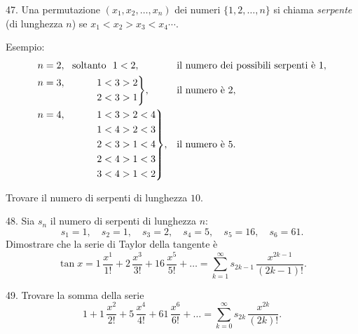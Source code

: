 \begin{problem}{47.}
	Una permutazione $(x_1,x_2, \dotsc,x_n)$ dei numeri $\{1, 2, \dotsc, n\}$ si chiama \emph{serpente} (di lunghezza $n$) se $x_1<x_2>x_3<x_4 \dotsb$.

	\begin{note}{Esempio:}
		\begin{equation*}
			\begin{aligned}[t]
				&\begin{aligned}[t] n=2, \text{\ \ soltanto\ \ } 1<2, \end{aligned} &&\text{il numero dei possibili serpenti è }1, \\
				&\hskip-\nulldelimiterspace\mathord{\left.\begin{aligned} n=3, \hphantom{\text{\ \ only\ \ }} 1&<3>2 \\ 
				2&<3>1\end{aligned} \right\}}, && \text{il numero è }2, \\
				&\hskip-\nulldelimiterspace\mathord{\left.\begin{aligned} n=4, \hphantom{\text{\ \ only\ \ }} 1&<3>2<4 \\ 
				1&<4>2<3 \\ 
				2&<3>1<4 \\ 
				2&<4>1<3 \\ 
				3&<4>1<2\end{aligned} \right\}},
				&&\text{il numero è }5. \\
			\end{aligned}
		\end{equation*}
	\end{note}
	Trovare il numero di serpenti di lunghezza  $10$.
\end{problem}

\begin{problem}{48.}
	Sia $s_n$ il numero di serpenti di lunghezza $n$:
	\begin{equation*}
		s_1=1, \quad s_2=1, \quad s_3=2, \quad s_4=5, \quad s_5=16, \quad s_6=61.
	\end{equation*}
	Dimostrare che la serie di Taylor della tangente è
	\begin{equation*}
		\tan x=1\, \frac{x^1}{1!}+2\, \frac{x^3}{3!}+16\, \frac{x^5}{5!}+\dots=
		\textstyle\sum\limits_{k=1}^{\infty} s_{2k-1}\, \frac{x^{2k-1}}{(2k-1)!}.
	\end{equation*}
\end{problem}

\begin{problem}{49.}
	Trovare la somma della serie 
	\begin{equation*}
		1+1\, \frac{x^2}{2!}+5\, \frac{x^4}{4!}+61\, \frac{x^6}{6!}+\dots=
		\textstyle\sum\limits_{k=0}^{\infty} s_{2k}\,\frac{x^{2k}}{(2k)!}.
	\end{equation*}
\end{problem}

